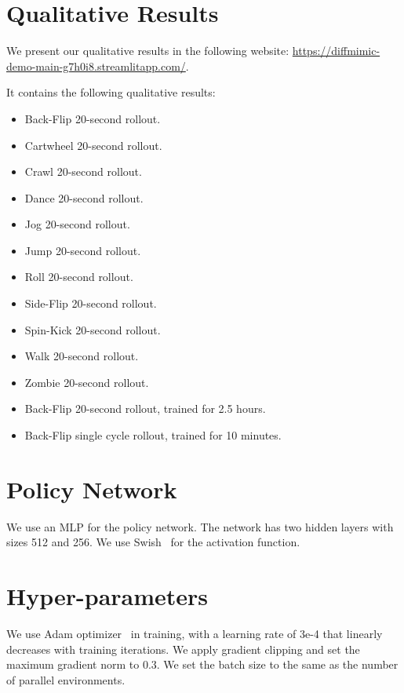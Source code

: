 \clearpage
\appendix
\tableofcontents

\section{Qualitative Results}

We present our qualitative results in the following website:
\href{https://diffmimic-demo-main-g7h0i8.streamlitapp.com/}{https://diffmimic-demo-main-g7h0i8.streamlitapp.com/}.

It contains the following qualitative results:
\begin{itemize}
    \item Back-Flip 20-second rollout.
    \item Cartwheel 20-second rollout.
    \item Crawl 20-second rollout.
    \item Dance 20-second rollout.
    \item Jog 20-second rollout.
    \item Jump 20-second rollout.
    \item Roll 20-second rollout.
    \item Side-Flip 20-second rollout.
    \item Spin-Kick 20-second rollout.
    \item Walk 20-second rollout.
    \item Zombie 20-second rollout.
    \item Back-Flip 20-second rollout, trained for 2.5 hours.
    \item Back-Flip single cycle rollout, trained for 10 minutes.
\end{itemize}

\section{Policy Network}
We use an MLP for the policy network. The network has two hidden layers with sizes 512 and 256. We use Swish~\citep{ramachandran2017searching} for the activation function.



\section{Hyper-parameters}
We use Adam optimizer~\citep{kingma2014adam} in training, with a learning rate of 3e-4 that linearly decreases with training iterations. We apply gradient clipping and set the maximum gradient norm to 0.3.  We set the batch size to the same as the number of parallel environments.

